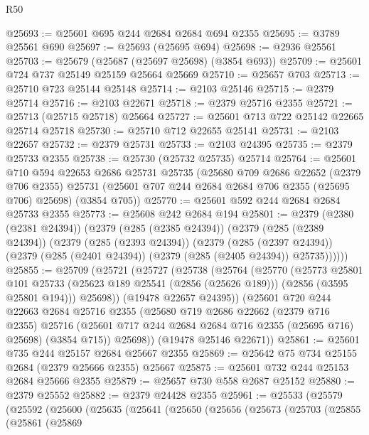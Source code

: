 \begin{lexlean}{R50}
\begin{coremodule}
@25693 := @25601 @695 @244 @2684 @2684 @694 @2355
@25695 := @3789 @25561 @690
@25697 := @25693 (@25695 @694)
@25698 := @2936 @25561
@25703 := @25679 (@25687 (@25697 @25698) (@3854 @693))
@25709 := @25601 @724 @737 @25149 @25159 @25664 @25669
@25710 := @25657 @703
@25713 := @25710 @723 @25144 @25148
@25714 := @2103 @25146
@25715 := @2379 @25714
@25716 := @2103 @22671
@25718 := @2379 @25716 @2355
@25721 := @25713 (@25715 @25718) @25664
@25727 := @25601 @713 @722 @25142 @22665 @25714 @25718
@25730 := @25710 @712 @22655 @25141
@25731 := @2103 @22657
@25732 := @2379 @25731
@25733 := @2103 @24395
@25735 := @2379 @25733 @2355
@25738 := @25730 (@25732 @25735) @25714
@25764 := @25601
    @710
    @594
    @22653
    @2686
    @25731
    @25735
    (@25680
      @709
      @2686
      @22652
      (@2379 @706 @2355)
      @25731
      (@25601 @707 @244 @2684 @2684 @706 @2355 (@25695 @706) @25698)
      (@3854 @705))
@25770 := @25601 @592 @244 @2684 @2684 @25733 @2355
@25773 := @25608 @242 @2684 @194
@25801 := @2379
    (@2380 (@2381 @24394))
    (@2379
      (@285 (@2385 @24394))
      (@2379
        (@285 (@2389 @24394))
        (@2379
          (@285 (@2393 @24394))
          (@2379
            (@285 (@2397 @24394))
            (@2379 (@285 (@2401 @24394)) (@2379 (@285 (@2405 @24394)) @25735))))))
@25855 := @25709
    (@25721
      (@25727
        (@25738
          (@25764
            (@25770
              (@25773
                @25801
                @101
                @25733
                (@25623 @189 @25541 (@2856 (@25626 @189)))
                (@2856 (@3595 @25801 @194)))
              @25698))
          (@19478 @22657 @24395))
        (@25601
          @720
          @244
          @22663
          @2684
          @25716
          @2355
          (@25680
            @719
            @2686
            @22662
            (@2379 @716 @2355)
            @25716
            (@25601 @717 @244 @2684 @2684 @716 @2355 (@25695 @716) @25698)
            (@3854 @715))
          @25698))
      (@19478 @25146 @22671))
@25861 := @25601 @735 @244 @25157 @2684 @25667 @2355
@25869 := @25642 @75 @734 @25155 @2684 (@2379 @25666 @2355) @25667
@25875 := @25601 @732 @244 @25153 @2684 @25666 @2355
@25879 := @25657 @730 @558 @2687 @25152
@25880 := @2379 @25552
@25882 := @2379 @24428 @2355
@25961 := @25533
    (@25579
      (@25592
        (@25600
          (@25635
            (@25641
              (@25650
                (@25656
                  (@25673
                    (@25703
                      (@25855
                        (@25861
                          (@25869

\end{coremodule}
\end{lexlean}
